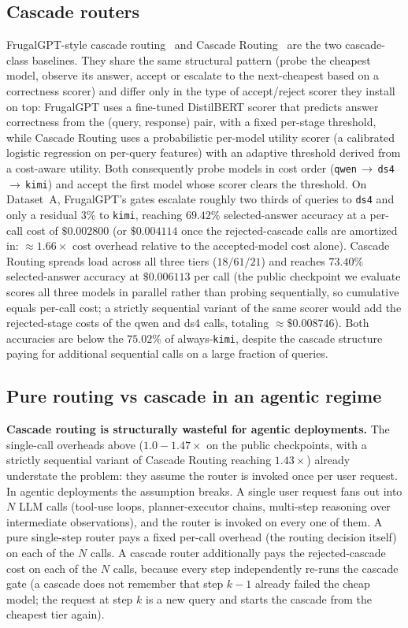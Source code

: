 \documentclass[twocolumn,10pt,a4paper]{article}
\begin{document}
\subsection{Cascade routers}\label{sec:baselines-cascade}
FrugalGPT-style cascade routing~\cite{chen2023frugalgpt} and Cascade Routing~\cite{jitkrittum2024cascade} are the two cascade-class baselines. They share the same structural pattern (probe the cheapest model, observe its answer, accept or escalate to the next-cheapest based on a correctness scorer) and differ only in the type of accept/reject scorer they install on top: FrugalGPT uses a fine-tuned DistilBERT scorer that predicts answer correctness from the (query, response) pair, with a fixed per-stage threshold, while Cascade Routing uses a probabilistic per-model utility scorer (a calibrated logistic regression on per-query features) with an adaptive threshold derived from a cost-aware utility. Both consequently probe models in cost order (\texttt{qwen}\,$\to$\,\texttt{ds4}\,$\to$\,\texttt{kimi}) and accept the first model whose scorer clears the threshold. On Dataset~A, FrugalGPT's gates escalate roughly two thirds of queries to \texttt{ds4} and only a residual $3\%$ to \texttt{kimi}, reaching $69.42\%$ selected-answer accuracy at a per-call cost of $\$0.002800$ (or $\$0.004114$ once the rejected-cascade calls are amortized in: $\approx 1.66\times$ cost overhead relative to the accepted-model cost alone). Cascade Routing spreads load across all three tiers ($18 / 61 / 21$) and reaches $73.40\%$ selected-answer accuracy at $\$0.006113$ per call (the public checkpoint we evaluate scores all three models in parallel rather than probing sequentially, so cumulative equals per-call cost; a strictly sequential variant of the same scorer would add the rejected-stage costs of the qwen and ds4 calls, totaling $\approx \$0.008746$). Both accuracies are below the $75.02\%$ of always-\texttt{kimi}, despite the cascade structure paying for additional sequential calls on a large fraction of queries.

\subsection{Pure routing vs cascade in an agentic regime}\label{sec:baselines-vs-cascade}
\textbf{Cascade routing is structurally wasteful for agentic deployments.} The single-call overheads above ($1.0{-}1.47\times$ on the public checkpoints, with a strictly sequential variant of Cascade Routing reaching $1.43\times$) already understate the problem: they assume the router is invoked once per user request. In agentic deployments the assumption breaks. A single user request fans out into $N$ LLM calls (tool-use loops, planner-executor chains, multi-step reasoning over intermediate observations), and the router is invoked on every one of them. A pure single-step router pays a fixed per-call overhead (the routing decision itself) on each of the $N$ calls. A cascade router additionally pays the rejected-cascade cost on each of the $N$ calls, because every step independently re-runs the cascade gate (a cascade does not remember that step $k{-}1$ already failed the cheap model; the request at step $k$ is a new query and starts the cascade from the cheapest tier again).
\end{document}
